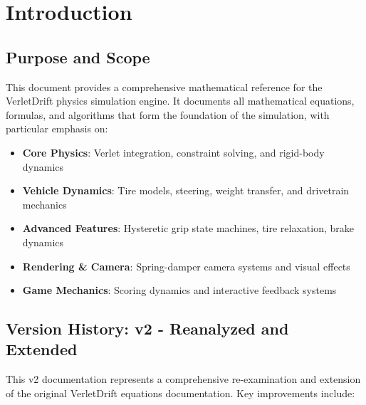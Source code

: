 \section*{Introduction}

\subsection*{Purpose and Scope}

This document provides a comprehensive mathematical reference for the VerletDrift physics simulation engine. It documents all mathematical equations, formulas, and algorithms that form the foundation of the simulation, with particular emphasis on:

\begin{itemize}
  \item \textbf{Core Physics}: Verlet integration, constraint solving, and rigid-body dynamics
  \item \textbf{Vehicle Dynamics}: Tire models, steering, weight transfer, and drivetrain mechanics
  \item \textbf{Advanced Features}: Hysteretic grip state machines, tire relaxation, brake dynamics
  \item \textbf{Rendering \& Camera}: Spring-damper camera systems and visual effects
  \item \textbf{Game Mechanics}: Scoring dynamics and interactive feedback systems
\end{itemize}

\subsection*{Version History: v2 - Reanalyzed and Extended}

This v2 documentation represents a comprehensive re-examination and extension of the original VerletDrift equations documentation. Key improvements include:

